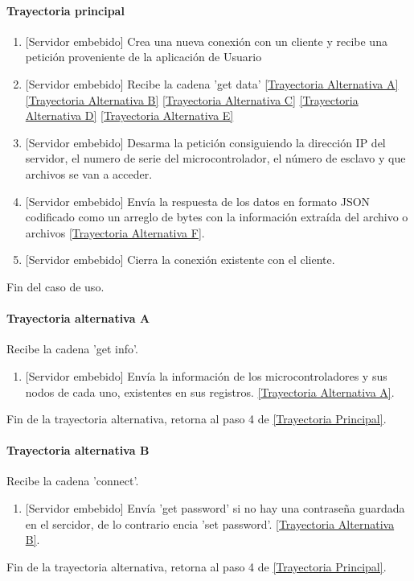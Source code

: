 
\paragraph{Trayectoria principal}
\label{SUB-M-CU1.4:TP}
	\begin{enumerate}
		\item {[Servidor embebido]} Crea una nueva conexión con un cliente y recibe una petición proveniente de la aplicación de Usuario
		
		\item {[Servidor embebido]} Recibe la cadena 'get data'
		\hyperref[SUB-M-CU1.4:TA]{[Trayectoria Alternativa A]}
		\hyperref[SUB-M-CU1.4:TB]{[Trayectoria Alternativa B]}
		\hyperref[SUB-M-CU1.4:TC]{[Trayectoria Alternativa C]}
		\hyperref[SUB-M-CU1.4:TD]{[Trayectoria Alternativa D]}
		\hyperref[SUB-M-CU1.4:TE]{[Trayectoria Alternativa E]}
		
		\item {[Servidor embebido]} Desarma la petición consiguiendo la dirección IP del servidor, el numero de serie del microcontrolador, el número de esclavo y que archivos se van a acceder.
		
		\item {[Servidor embebido]} Envía la respuesta de los datos en formato JSON codificado como un arreglo de bytes con la información extraída del archivo o archivos \hyperref[SUB-M-CU1.4:TF]{[Trayectoria Alternativa F]}.
		
		\item {[Servidor embebido]} Cierra la conexión existente con el cliente.
	
	\end{enumerate}
	Fin del caso de uso.

\paragraph{Trayectoria alternativa A} \label{SUB-M-CU1.4:TA}
	Recibe la cadena 'get info'.
	\begin{enumerate}[label=A\arabic*.]
		\item {[Servidor embebido]} Envía la información de los microcontroladores y sus nodos de cada uno, existentes en sus registros.
		\hyperref[SUB-M-CU1.4:TA]{[Trayectoria Alternativa A]}.
	\end{enumerate}
	Fin de la trayectoria alternativa, retorna al paso 4 de  \hyperref[SUB-M-CU1.4:TP]{[Trayectoria Principal]}.
	
\paragraph{Trayectoria alternativa B} \label{SUB-M-CU1.4:TB}
	Recibe la cadena 'connect'.
	\begin{enumerate}[label=B\arabic*.]
		\item {[Servidor embebido]} Envía 'get password' si no hay una contraseña guardada en el sercidor, de lo contrario encia 'set password'.
		\hyperref[SUB-M-CU1.4:TB]{[Trayectoria Alternativa B]}.
	\end{enumerate}
	Fin de la trayectoria alternativa, retorna al paso 4 de  \hyperref[SUB-M-CU1.4:TP]{[Trayectoria Principal]}.
	
